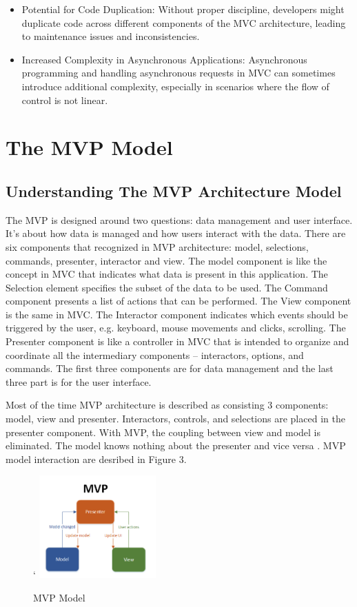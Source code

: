 \documentclass[conference]{IEEEtran}
\begin{document}
\begin{itemize}
\begin{enumerate}
\begin{itemize}
\item Potential for Code Duplication: Without proper discipline, developers might duplicate code across different components of the MVC architecture, leading to maintenance issues and inconsistencies.
\item Increased Complexity in Asynchronous Applications: Asynchronous programming and handling asynchronous requests in MVC can sometimes introduce additional complexity, especially in scenarios where the flow of control is not linear.
\end{itemize}
\end{enumerate}
\end{itemize}
\section*{The MVP Model}
\subsection{Understanding The MVP Architecture Model}

The MVP is designed around two questions: data management and user interface. It's about how data is managed and how  users interact with the data. There are six components that recognized in MVP architecture: model, selections, commands, presenter, interactor and view. The model component is like the concept in MVC that indicates what  data is present in this application. The Selection element specifies the subset  of the data to be used. The Command component presents a list of actions that can  be performed. The View component is the same in MVC. The Interactor component indicates which events should be triggered by the user, e.g. keyboard, mouse movements and clicks, scrolling. The Presenter component is like a controller in MVC that is intended to organize and coordinate all the intermediary components – interactors, options, and commands. The first three components are for data management and the last three part is for the user interface.

Most of the time MVP architecture is described as consisting 3 components: model, view and presenter. Interactors, controls, and selections are placed in the presenter component.
With MVP, the coupling between view and model is eliminated. The model knows nothing about the presenter and vice versa \cite{c5}.
MVP model interaction are desribed in Figure 3.

\begin{figure}
    [h]
`   \centering
    \includegraphics[width = 0.4\textwidth]{Image/MVP model.png}
    \caption{MVP Model}
\end{figure}
\end{document}
